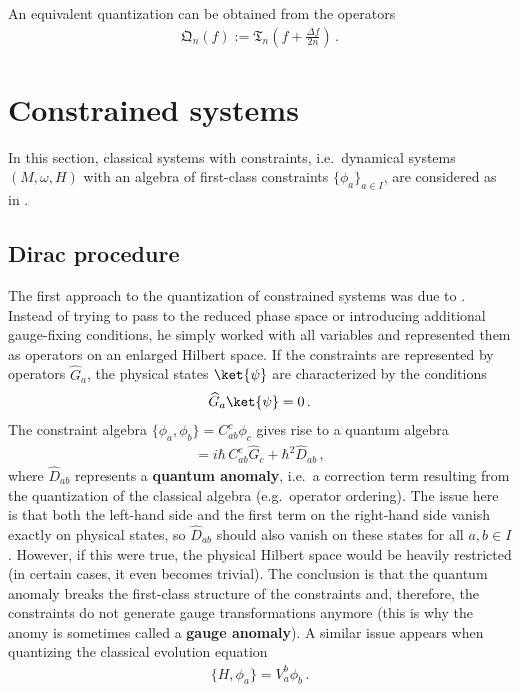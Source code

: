     \begin{remark}
        An equivalent quantization can be obtained from the operators
        \begin{gather}
            \mathfrak{Q}_n(f) := \mathfrak{T}_n\left(f + \frac{\Delta f}{2n}\right)\,.
        \end{gather}
    \end{remark}


\section{Constrained systems}\label{section:quantum_constrained}

    In this section, classical systems with constraints, i.e.~dynamical systems $(M,\omega,H)$ with an algebra of first-class constraints $\{\phi_a\}_{a\in I}$, are considered as in .

\subsection{Dirac procedure}

    The first approach to the quantization of constrained systems was due to . Instead of trying to pass to the reduced phase space or introducing additional gauge-fixing conditions, he simply worked with all variables and represented them as operators on an enlarged Hilbert space. If the constraints are represented by operators $\widehat{G}_a$, the physical states $\ket{\psi}$ are characterized by the conditions
    \begin{gather}
        \widehat{G}_a\ket{\psi}=0\,.
    \end{gather}
    The constraint algebra $\{\phi_a,\phi_b\} = C^c_{ab}\phi_c$ gives rise to a quantum algebra
    \begin{gather}
        [\widehat{G}_a,\widehat{G}_b] = i\hbar\,C^c_{ab}\widehat{G}_c + \hbar^2\widehat{D}_{ab}\,,
    \end{gather}
    where $\widehat{D}_{ab}$ represents a \textbf{quantum anomaly}, i.e.~a correction term resulting from the quantization of the classical algebra (e.g.~operator ordering). The issue here is that both the left-hand side and the first term on the right-hand side vanish exactly on physical states, so $\widehat{D}_{ab}$ should also vanish on these states for all $a,b\in I$. However, if this were true, the physical Hilbert space would be heavily restricted (in certain cases, it even becomes trivial). The conclusion is that the quantum anomaly breaks the first-class structure of the constraints and, therefore, the constraints do not generate gauge transformations anymore (this is why the anomy is sometimes called a \textbf{gauge anomaly}). A similar issue appears when quantizing the classical evolution equation
    \begin{gather}
        \{H,\phi_a\} = V_a^b\phi_b\,.
    \end{gather}

